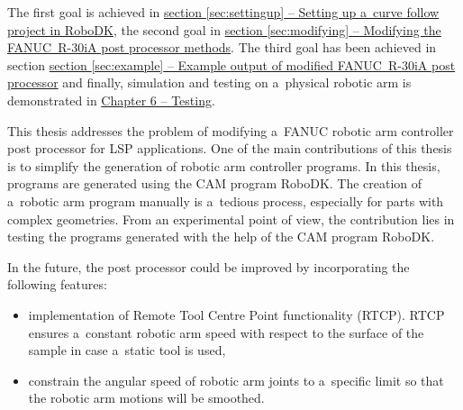 
The first goal is achieved in \hyperref[sec:settingup]{section \ref{sec:settingup} -- Setting up a~curve follow project in RoboDK}, the second goal in \hyperref[sec:modifying]{section \ref{sec:modifying} -- Modifying the FANUC~R-30iA post processor methods}. The third goal has been achieved in section  \hyperref[sec:example]{section \ref{sec:example} -- Example output of modified FANUC~R-30iA post processor} and finally, simulation and testing on a~physical robotic arm is demonstrated in \hyperref[chap:testing]{Chapter 6 -- Testing}.

This thesis addresses the problem of modifying a~FANUC robotic arm controller post processor for LSP applications. One of the main contributions of this thesis is to simplify the generation of robotic arm controller programs. In this thesis, programs are generated using the CAM  program RoboDK. The creation of a~robotic arm program manually is a~tedious process, especially for parts with complex geometries. From an experimental point of view, the contribution lies in testing the programs generated with the help of the CAM program RoboDK.

In the future, the post processor could be improved by incorporating the following features:

\begin{itemize}

    \item implementation of Remote Tool Centre Point functionality (RTCP). RTCP ensures a~constant robotic arm speed with respect to the surface of the sample in case a~static tool is used,

    \item constrain the angular speed of robotic arm joints to a~specific limit so that the robotic arm motions will be smoothed.

\end{itemize}

